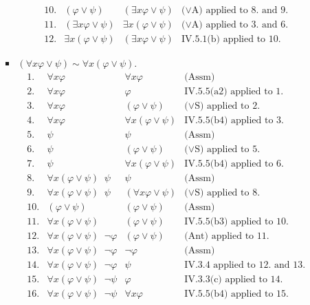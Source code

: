 \begin{enumerate}[1.]
\begin{enumerate}[(1)]
\begin{itemize}
\[\begin{array}{llll}
10. & (\varphi \lor \psi) & (\exists x \varphi \lor \psi) & \mbox{($\lor$A) applied to 8. and 9.} \\
11. & (\exists x \varphi \lor \psi) & \exists x (\varphi \lor \psi) & \mbox{($\lor$A) applied to 3. and 6.} \\
12. & \exists x (\varphi \lor \psi) & (\exists x \varphi \lor \psi) & \mbox{IV.5.1(b) applied to 10.}
\end{array}
\]
\item $(\forall x \varphi \lor \psi) \sim \forall x (\varphi \lor \psi)$.
\[
\begin{array}{llll}
1. & \forall x \varphi & \forall x \varphi & \mbox{(Assm)} \\
2. & \forall x \varphi & \varphi & \mbox{IV.5.5(a2) applied to 1.} \\
3. & \forall x \varphi & (\varphi \lor \psi) & \mbox{($\lor$S) applied to 2.} \\
4. & \forall x \varphi & \forall x (\varphi \lor \psi) & \mbox{IV.5.5(b4) applied to 3.} \\
5. & \psi & \psi & \mbox{(Assm)} \\
6. & \psi & (\varphi \lor \psi) & \mbox{($\lor$S) applied to 5.} \\
7. & \psi & \forall x (\varphi \lor \psi) & \mbox{IV.5.5(b4) applied to 6.} \\
8. & \forall x (\varphi \lor \psi) \;\; \psi & \psi & \mbox{(Assm)} \\
9. & \forall x (\varphi \lor \psi) \;\; \psi & (\forall x \varphi \lor \psi) & \mbox{($\lor$S) applied to 8.} \\
10. & (\varphi \lor \psi) & (\varphi \lor \psi) & \mbox{(Assm)} \\
11. & \forall x (\varphi \lor \psi) & (\varphi \lor \psi) & \mbox{IV.5.5(b3) applied to 10.}\\
12. & \forall x (\varphi \lor \psi) \;\; \neg \varphi & (\varphi \lor \psi) & \mbox{(Ant) applied to 11.} \\
13. & \forall x (\varphi \lor \psi) \;\; \neg \varphi & \neg \varphi & \mbox{(Assm)} \\
14. & \forall x (\varphi \lor \psi) \;\; \neg \varphi & \psi & \mbox{IV.3.4 applied to 12. and 13.} \\
15. & \forall x (\varphi \lor \psi) \;\; \neg \psi & \varphi & \mbox{IV.3.3(c) applied to 14.} \\
16. & \forall x (\varphi \lor \psi) \;\; \neg \psi & \forall x \varphi & \mbox{IV.5.5(b4) applied to 15.} \\

\end{array}\]
\end{itemize}
\end{enumerate}
\end{enumerate}
